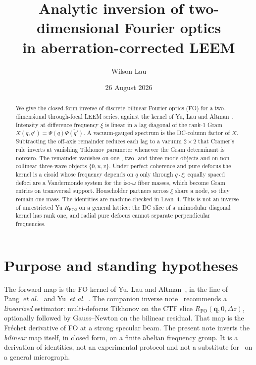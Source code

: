\documentclass[11pt,a4paper]{article}
\title{Analytic inversion of two-dimensional Fourier optics\\
in aberration-corrected LEEM}
\author{Wilson Lau}
\date{26 August 2026}
\theoremstyle{definition}
\theoremstyle{remark}
\newcommand{\conj}[1]{\overline{#1}}
\newcommand{\Dz}{\Delta z}
\newcommand{\RFO}{R_{\mathrm{FO}}}
\newcommand{\RFOII}{R_{\mathrm{FO2}}}
\begin{document}
\maketitle

\begin{abstract}
We give the closed-form inverse of discrete bilinear Fourier optics
(FO) for a two-dimensional through-focal LEEM series, against the
kernel of Yu, Lau and Altman~\cite{Yu2019}.
Intensity at difference frequency $\xi$ is linear in a lag diagonal of
the rank-1 Gram $X(q,q')=\Psi(q)\conj{\Psi(q')}$.
A vacuum-gauged spectrum is the DC-column factor of $X$.
Subtracting the off-axis remainder reduces each lag to a vacuum
$2\times 2$ that Cramer's rule inverts at vanishing Tikhonov parameter
whenever the Gram determinant is nonzero.
The remainder vanishes on one-, two- and three-mode objects and on
non-collinear three-wave objects $\{0,u,v\}$.
Under perfect coherence and pure defocus the kernel is a cisoid whose
frequency depends on $q$ only through $q\cdot\xi$; equally spaced
defoci are a Vandermonde system for the iso-$\omega$ fiber masses, which
become Gram entries on transversal support.
Householder partners across $\xi$ share a node, so they remain one
mass.
The identities are machine-checked in Lean~4.
This is not an inverse of unrestricted Yu $\RFOII$ on a general
lattice: the DC slice of a unimodular diagonal kernel has rank one,
and radial pure defocus cannot separate perpendicular frequencies.
\end{abstract}

\tableofcontents

\section{Purpose and standing hypotheses}
\label{sec:purpose}

The forward map is the FO kernel of Yu, Lau and
Altman~\cite{Yu2019}, in the line of Pang~\emph{et
al.}~\cite{Pang2009} and Yu~\emph{et al.}~\cite{Yu2017}.
The companion inverse note~\cite{Lau2026inverse} recommends a
\emph{linearized} estimator: multi-defocus Tikhonov on the CTF slice
$\RFO(\mathbf{q},0,\Dz)$, optionally followed by Gauss--Newton on the
bilinear residual.
That map is the Fr\'echet derivative of FO at a strong specular beam.
The present note inverts the \emph{bilinear} map itself, in closed
form, on a finite abelian frequency group.
It is a derivation of identities, not an experimental protocol and not
a substitute for~\cite{Lau2026inverse} on a general micrograph.
\end{document}
